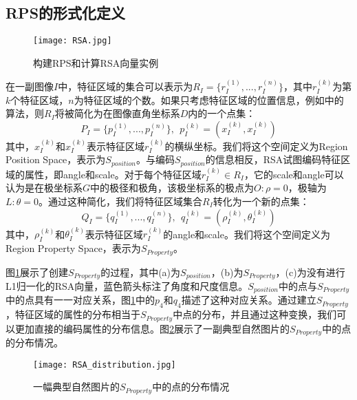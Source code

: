 \subsection{RPS的形式化定义}
\begin{figure}[h]
	\centering
	\texttt{[image: RSA.jpg]}
	\caption{构建RPS和计算RSA向量实例}\label{fig:RSA}
\end{figure}
在一副图像$I$中，特征区域的集合可以表示为$R_I=\{r_I^{(1)},...,r_I^{(n)}\}$，其中$r_I^{(k)}$为第$k$个特征区域，$n$为特征区域的个数。如果只考虑特征区域的位置信息，例如\cite{lazebnik2006beyond}\cite{Cao2010Spatial}\cite{penatti2014visual}中的算法，则$R_I$将被简化为在图像直角坐标系$D$内的一个点集：
\begin{equation}
P_I=\{p_I^{(1)},...,p_I^{(n)}\}, ~~p_I^{(k)}=(x_I^{(k)},x_I^{(k)})
\end{equation}
其中，$x_I^{(k)}$和$x_I^{(k)}$表示特征区域$r_I^{(k)}$的横纵坐标。我们将这个空间定义为Region Position Space，表示为$S_{position}$。与编码$S_{position}$的信息相反，RSA试图编码特征区域的属性，即angle和scale。对于每个特征区域$r_I^{(k)} \in R_I$，它的scale和angle可以认为是在极坐标系$G$中的极径和极角，该极坐标系的极点为$O : \rho = 0$，极轴为$L : \theta = 0$。通过这种简化，我们将特征区域集合$R_I$转化为一个新的点集：
\begin{equation}
Q_I=\{q_I^{(1)},...,q_I^{(n)}\}, ~~q_I^{(k)}=(\rho_I^{(k)},\theta_I^{(k)})
\end{equation}
其中，$\rho_I^{(k)}$和$\theta_I^{(k)}$表示特征区域$r_I^{(k)}$的angle和scale。我们将这个空间定义为Region Property Space，表示为$S_{Property}$。

图\ref{fig:RSA}展示了创建$S_{Property}$的过程，其中(a)为$S_{position}$，(b)为$S_{Property}$，(c)为没有进行L1归一化的RSA向量，蓝色箭头标注了角度和尺度信息。$S_{position}$中的点与$S_{Property}$中的点具有一一对应关系，图\ref{fig:RSA}中的$p_4$和$q_4$描述了这种对应关系。通过建立$S_{Property}$，特征区域的属性的分布相当于$S_{Property}$中点的分布，并且通过这种变换，我们可以更加直接的编码属性的分布信息。图\ref{fig:RSA_dis}展示了一副典型自然图片的$S_{Property}$中的点的分布情况。
\begin{figure}[h]
	\centering
	\texttt{[image: RSA\_distribution.jpg]}
	\caption{一幅典型自然图片的$S_{Property}$中的点的分布情况}\label{fig:RSA_dis}
\end{figure}


